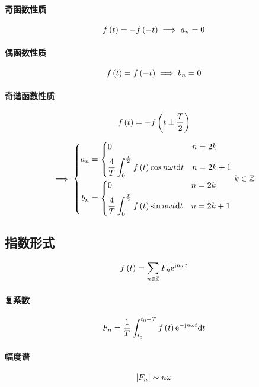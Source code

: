 \documentclass{article}
\begin{document}
\paragraph{奇函数性质}\[f\left(t\right)=-f\left(-t\right)\implies a_n=0\]

\paragraph{偶函数性质}\[f\left(t\right)=f\left(-t\right)\implies b_n=0\]

\paragraph{奇谐函数性质}\[f\left(t\right)=-f\left(t\pm\frac T2\right)\]

\[\implies\left\{\begin{aligned}
        a_n & =
        \left\{\begin{aligned}
                    & 0                                             &  & n=2k   \\
                    & \frac4T\int_0^{\frac T2}f\left(t\right)\cos n\omega t\mathrm d t &  & n=2k+1
               \end{aligned}\right. \\
        b_n & =
        \left\{\begin{aligned}
                    & 0                                             &  & n=2k   \\
                    & \frac4T\int_0^{\frac T2}f\left(t\right)\sin n\omega t\mathrm d t &  & n=2k+1
               \end{aligned}\right.
    \end{aligned}\right.k\in\mathbb Z\]

\subsection{指数形式}

\[f\left(t\right)=\sum_{n\in\mathbb Z}F_n\mathrm e^{\mathrm j n\omega t}\]

\paragraph{复系数}

\[F_n=\frac1T\int_{t_0}^{t_0+T}f\left(t\right)\mathrm e^{-\mathrm j n\omega t}\mathrm d t\]

\paragraph{幅度谱}

\[\left|F_n\right|\sim n\omega\]
\end{document}
